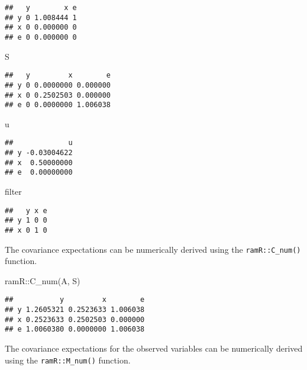 \documentclass[
]{book}
\newenvironment{Shaded}{\begin{snugshade}}{\end{snugshade}}
\newcommand{\FunctionTok}[1]{\textcolor[rgb]{0.00,0.00,0.00}{#1}}
\newcommand{\NormalTok}[1]{#1}
\newcommand{\SpecialCharTok}[1]{\textcolor[rgb]{0.00,0.00,0.00}{#1}}
\theoremstyle{definition}
\theoremstyle{definition}
\theoremstyle{definition}
\theoremstyle{remark}
\begin{document}
\begin{verbatim}
##   y        x e
## y 0 1.008444 1
## x 0 0.000000 0
## e 0 0.000000 0
\end{verbatim}

\begin{Shaded}
\begin{Highlighting}[]
\NormalTok{S}
\end{Highlighting}
\end{Shaded}

\begin{verbatim}
##   y         x        e
## y 0 0.0000000 0.000000
## x 0 0.2502503 0.000000
## e 0 0.0000000 1.006038
\end{verbatim}

\begin{Shaded}
\begin{Highlighting}[]
\NormalTok{u}
\end{Highlighting}
\end{Shaded}

\begin{verbatim}
##             u
## y -0.03004622
## x  0.50000000
## e  0.00000000
\end{verbatim}

\begin{Shaded}
\begin{Highlighting}[]
\NormalTok{filter}
\end{Highlighting}
\end{Shaded}

\begin{verbatim}
##   y x e
## y 1 0 0
## x 0 1 0
\end{verbatim}

The covariance expectations
can be numerically derived using the \texttt{ramR::C\_num()} function.

\begin{Shaded}
\begin{Highlighting}[]
\NormalTok{ramR}\SpecialCharTok{::}\FunctionTok{C\_num}\NormalTok{(A, S)}
\end{Highlighting}
\end{Shaded}

\begin{verbatim}
##           y         x        e
## y 1.2605321 0.2523633 1.006038
## x 0.2523633 0.2502503 0.000000
## e 1.0060380 0.0000000 1.006038
\end{verbatim}

The covariance expectations for the observed variables
can be numerically derived using the \texttt{ramR::M\_num()} function.
\end{document}
